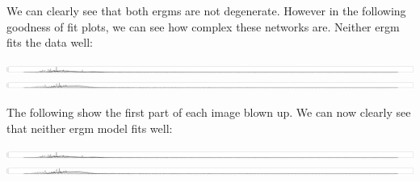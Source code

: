 \documentclass[12pt]{article}
\begin{document}
We can clearly see that both ergms are not degenerate. However in the following goodness of fit plots, we can see how complex these networks are. Neither ergm fits the data well:
\vspace{2mm}
\begin{center} 
	\includegraphics[scale=0.05]{Images/Sci_fit2.pdf} 
	\includegraphics[scale=0.05]{Images/Indeed_fit2.pdf} 
\end{center} 
\vspace{2mm}
The following show the first part of each image blown up. We can now clearly see that neither ergm model fits well:
\vspace{2mm}
\begin{center} 
	\includegraphics[scale=0.5]{Images/Sci_fit2.pdf} 
	\includegraphics[scale=0.5]{Images/Indeed_fit2.pdf} 
\end{center} 
\vspace{2mm}
\end{document}
